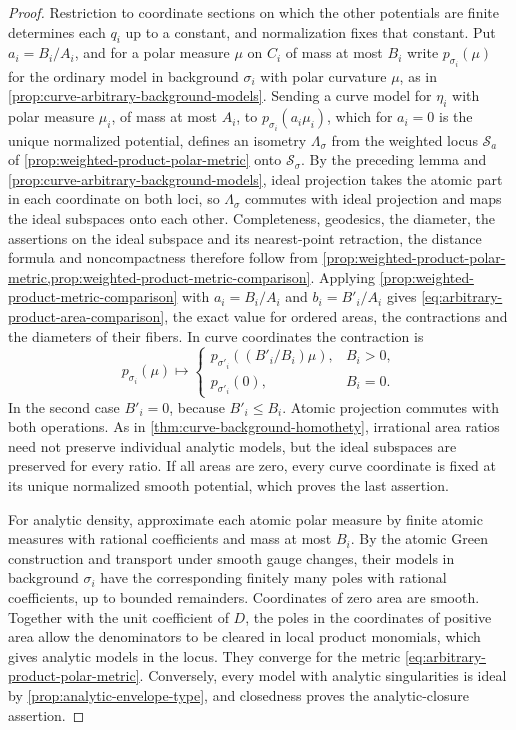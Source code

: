 \begin{proof}
Restriction to coordinate sections on which the other potentials are finite determines each $q_i$ up to a constant, and normalization fixes that constant. Put $a_i=B_i/A_i$, and for a polar measure $\mu$ on $C_i$ of mass at most $B_i$ write $p_{\sigma_i}(\mu)$ for the ordinary model in background $\sigma_i$ with polar curvature $\mu$, as in \cref{prop:curve-arbitrary-background-models}. Sending a curve model for $\eta_i$ with polar measure $\mu_i$, of mass at most $A_i$, to $p_{\sigma_i}(a_i\mu_i)$, which for $a_i=0$ is the unique normalized potential, defines an isometry $\Lambda_\sigma$ from the weighted locus $\mathcal S_a$ of \cref{prop:weighted-product-polar-metric} onto $\mathcal S_\sigma$. By the preceding lemma and \cref{prop:curve-arbitrary-background-models}, ideal projection takes the atomic part in each coordinate on both loci, so $\Lambda_\sigma$ commutes with ideal projection and maps the ideal subspaces onto each other. Completeness, geodesics, the diameter, the assertions on the ideal subspace and its nearest-point retraction, the distance formula and noncompactness therefore follow from \cref{prop:weighted-product-polar-metric,prop:weighted-product-metric-comparison}. Applying \cref{prop:weighted-product-metric-comparison} with $a_i=B_i/A_i$ and $b_i=B'_i/A_i$ gives \eqref{eq:arbitrary-product-area-comparison}, the exact value for ordered areas, the contractions and the diameters of their fibers. In curve coordinates the contraction is
\[
 p_{\sigma_i}(\mu)\longmapsto
 \begin{cases}
 p_{\sigma'_i}((B'_i/B_i)\mu),&B_i>0,\\
 p_{\sigma'_i}(0),&B_i=0.
 \end{cases}
\]
In the second case $B'_i=0$, because $B'_i\leq B_i$. Atomic projection commutes with both operations. As in \cref{thm:curve-background-homothety}, irrational area ratios need not preserve individual analytic models, but the ideal subspaces are preserved for every ratio. If all areas are zero, every curve coordinate is fixed at its unique normalized smooth potential, which proves the last assertion.

For analytic density, approximate each atomic polar measure by finite atomic measures with rational coefficients and mass at most $B_i$. By the atomic Green construction and transport under smooth gauge changes, their models in background $\sigma_i$ have the corresponding finitely many poles with rational coefficients, up to bounded remainders. Coordinates of zero area are smooth. Together with the unit coefficient of $D$, the poles in the coordinates of positive area allow the denominators to be cleared in local product monomials, which gives analytic models in the locus. They converge for the metric \eqref{eq:arbitrary-product-polar-metric}. Conversely, every model with analytic singularities is ideal by \cref{prop:analytic-envelope-type}, and closedness proves the analytic-closure assertion.


\end{proof}

